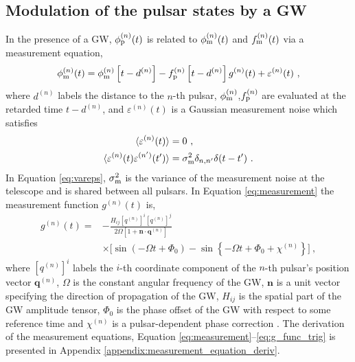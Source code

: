 \documentclass[fleqn,usenatbib,useAMS]{mnras}
\begin{document}
\subsection{Modulation of the pulsar states by a GW}\label{sec:gw_background_modulation}
In the presence of a GW, $\phi_{\rm p}^{(n)}(t)$ is related to  $\phi_{\rm m}^{(n)}(t)$ and $f_{\rm m}^{(n)}(t)$ via a measurement equation,
\begin{equation}
	\phi_{\rm m}^{(n)}(t) = \phi_{\rm m}^{(n)}\left[t-d^{(n)}\right] - f_{\rm p}^{(n)}\left [t-d^{(n)} \right ] g^{(n)}(t) +  \varepsilon^{(n)}(t)\ ,
	\label{eq:measurement}
\end{equation}
where $d^{(n)}$ labels the distance to the $n$-th pulsar,  $\phi_{\rm m}^{(n)}$,$f_{\rm p}^{(n)}$ are evaluated at the retarded time $t-d^{(n)}$, and $\varepsilon^{(n)}(t)$ is a Gaussian measurement noise which satisfies 
\begin{align}
	\langle \varepsilon^{(n)}(t) \rangle &= 0 \ , \\
	\langle \varepsilon^{(n)}(t) \varepsilon^{(n')}(t') \rangle &= \sigma_{\rm m}^2 \delta_{n,n'} \delta(t - t') \ .	\label{eq:vareps}
\end{align}
In Equation \eqref{eq:vareps}, $\sigma_{\rm m}^2$ is the variance of the measurement noise at the telescope and is shared between all pulsars. In Equation \eqref{eq:measurement} the measurement function $g^{(n)}(t)$ is,
\begin{align}
	g^{(n)}(t) =& - \frac{ H_{ij}[q^{(n)}]^i [q^{(n)}]^j }{2 \Omega [1 + \boldsymbol{n}\cdot \boldsymbol{q}^{(n)}] } \nonumber \\
	& \times \Big[\sin\left(-\Omega t +\Phi_0\right) - \sin \left \{-\Omega t +\Phi_0 + \chi^{(n)} \right \} \Big ] \ ,
	\label{eq:g_func_trig}
\end{align}
where $[q^{(n)}]^i$ labels the $i$-th coordinate component of the $n$-th pulsar's position vector $\boldsymbol{q}^{(n)}$, $\Omega$ is the constant angular frequency of the GW, $\boldsymbol{n}$ is a unit vector specifying the direction of propagation of the GW, $H_{ij}$ is the spatial part of the GW amplitude tensor, $\Phi_0$ is the phase offset of the GW with respect to some reference time and $\chi^{(n)}$ is a pulsar-dependent phase correction \citep[see][for additional discussion on $\chi^{(n)}$]{KimpsonPTA2}. The derivation of the measurement equations, Equation \eqref{eq:measurement}--\eqref{eq:g_func_trig} is presented in Appendix \ref{appendix:measurement_equation_deriv}.
\end{document}
